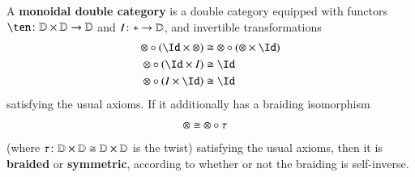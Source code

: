 \documentclass{amsart}
\begin{document}
\begin{defn}\label{def:symmondoub}
  A \textbf{monoidal double category} is a double category equipped
  with functors $\ten\maps \lD\times\lD\to\lD$ and $I\colon * \to\mathbb{D}$,
  and invertible transformations
  \begin{align*}
    \mathord{\otimes} \circ (\Id\times \mathord{\otimes})
    &\iso \mathord{\otimes} \circ (\mathord{\otimes} \times \Id)\\
    \mathord{\otimes} \circ (\Id\times I) &\iso \Id\\
    \mathord{\otimes} \circ (I\times \Id) &\iso \Id
  \end{align*}
  satisfying the usual axioms.  If it additionally has a braiding
  isomorphism
  \begin{align*}
    \mathord{\otimes} &\cong \mathord{\otimes} \circ \tau
  \end{align*}
  (where $\tau\colon \mathbb{D}\times\mathbb{D}\cong \mathbb{D}\times\mathbb{D}$ is the twist)
  satisfying the usual axioms, then it is \textbf{braided} or
  \textbf{symmetric}, according to whether or not the braiding is
  self-inverse.
\end{defn}
\end{document}

